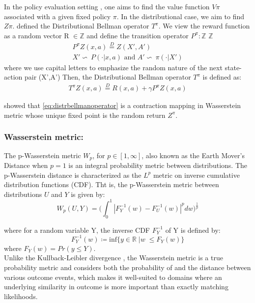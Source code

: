In the policy evaluation setting \cite{Sutton1998}, one aims to find the value function
$V\pi$ associated
with a given fixed policy $\pi$. In the distributional case, we aim to find $Z\pi$.
\cite{Bellemare2017} defined the Distributional Bellman operator $T^\pi$.
We view the reward function as a random vector R $\in \mathbb{Z}$ and define the transition
operator 
$P^\pi: \mathbb{Z} $ \ra $\mathbb{Z}$
\begin{eqnarray}
    P^\pi Z(x,a) \stackrel{D}{=} Z(X',A')\\
    X'\backsim\ P(\cdot|x,a) \text{ and } A' \backsim\ \pi(\cdot |X')
\end{eqnarray}
where we use capital letters to emphasize the random nature of the next state-action pair
 (X',A')
Then, the Distributional Bellman operator $T^\pi$ is defined as:
\begin{eqnarray}
    T^\pi Z(x,a) \stackrel{D}{=} R(x,a) + \gamma P^\pi Z(x,a) \label{eq:distrbellmanoperator}
\end{eqnarray}


\cite{Bellemare2017} showed that \eqref{eq:distrbellmanoperator} is a contraction
mapping in Wasserstein metric whose unique fixed point is the 
random return $Z^\pi$.

\subsubsection{Wasserstein metric:}

The p-Wasserstein metric $W_p$, for $p \in [1,\infty]$, also known as the Earth Mover's 
Distance when $p=1$ is an integral probability metric between distributions. The
p-Wasserstein distance is characterized 
as the $L^p $ metric on inverse cumulative distribution functions (CDF). Tht is, the
p-Wasserstein metric
between distributions $U $ and $Y $ is given by:
\begin{equation}
    W_p(U,Y) = \big (  \int_{0}^{1} | F_Y^{-1}(w) - F_U^{-1}(w) |^p dw   \big )^{\frac{1}{p}}
\end{equation}

where for a random variable Y, the inverse CDF $F_Y^{-1}$ of Y is defined by:
\begin{equation}
    F_Y^{-1}(w) \coloneqq \text{inf} \big\{ y \in \mathbb{R} \; | w \; \leq   F_Y(w)    \big\}
\end{equation}
where $F_Y(w) = Pr(y \leq Y)$. \\
Unlike the Kullback-Leibler divergence , the Wasserstein metric is a true probability
metric and considers both the probability of
and the distance between various outcome events, which makes it well-suited to domains 
where an underlying similarity in outcome is more important than exactly matching likelihoods.

